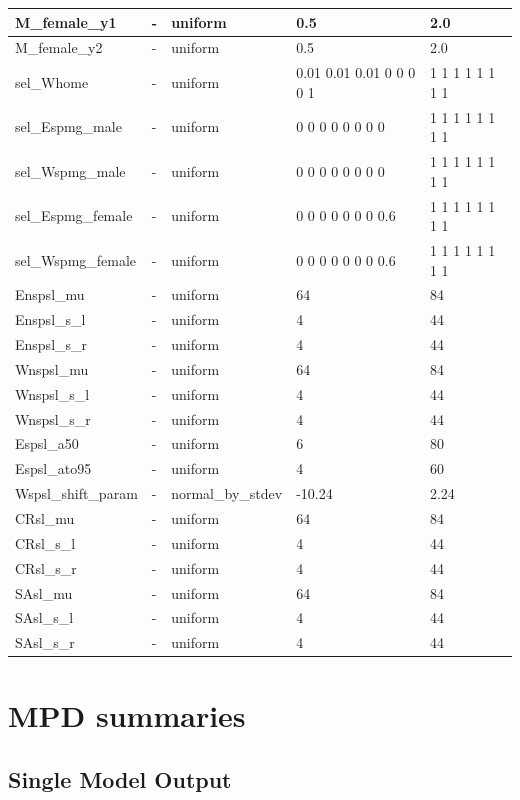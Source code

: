 \documentclass[
]{book}
\begin{document}
\begin{table}
\begin{tabular}[t]{l|l|l|l|l}
\hline
M\_female\_y1 & - & uniform & 0.5 & 2.0\\
\hline
M\_female\_y2 & - & uniform & 0.5 & 2.0\\
\hline
sel\_Whome & - & uniform & 0.01 0.01 0.01 0 0 0 0 1 & 1 1 1 1 1 1 1 1\\
\hline
sel\_Espmg\_male & - & uniform & 0 0 0 0 0 0 0 0 & 1 1 1 1 1 1 1 1\\
\hline
sel\_Wspmg\_male & - & uniform & 0 0 0 0 0 0 0 0 & 1 1 1 1 1 1 1 1\\
\hline
sel\_Espmg\_female & - & uniform & 0 0 0 0 0 0 0 0.6 & 1 1 1 1 1 1 1 1\\
\hline
sel\_Wspmg\_female & - & uniform & 0 0 0 0 0 0 0 0.6 & 1 1 1 1 1 1 1 1\\
\hline
Enspsl\_mu & - & uniform & 64 & 84\\
\hline
Enspsl\_s\_l & - & uniform & 4 & 44\\
\hline
Enspsl\_s\_r & - & uniform & 4 & 44\\
\hline
Wnspsl\_mu & - & uniform & 64 & 84\\
\hline
Wnspsl\_s\_l & - & uniform & 4 & 44\\
\hline
Wnspsl\_s\_r & - & uniform & 4 & 44\\
\hline
Espsl\_a50 & - & uniform & 6 & 80\\
\hline
Espsl\_ato95 & - & uniform & 4 & 60\\
\hline
Wspsl\_shift\_param & - & normal\_by\_stdev & -10.24 & 2.24\\
\hline
CRsl\_mu & - & uniform & 64 & 84\\
\hline
CRsl\_s\_l & - & uniform & 4 & 44\\
\hline
CRsl\_s\_r & - & uniform & 4 & 44\\
\hline
SAsl\_mu & - & uniform & 64 & 84\\
\hline
SAsl\_s\_l & - & uniform & 4 & 44\\
\hline
SAsl\_s\_r & - & uniform & 4 & 44\\
\hline
\end{tabular}
\end{table}

\hypertarget{mpd-summaries}{%
\chapter{MPD summaries}\label{mpd-summaries}}

\hypertarget{single-model-output}{%
\section{Single Model Output}\label{single-model-output}}
\end{document}
